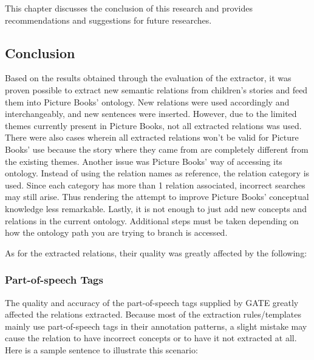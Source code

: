 %
%
%                 

\label{sec:conclusionandreco}

This chapter discusses the conclusion of this research and provides recommendations and suggestions for future researches.

\subsection{Conclusion}
\label{sec:conclusion}

Based on the results obtained through the evaluation of the extractor, it was proven possible to extract new semantic relations from children's stories and feed them into Picture Books' ontology. New relations were used accordingly and interchangeably, and new sentences were inserted. However, due to the limited themes currently present in Picture Books, not all extracted relations was used. There were also cases wherein all extracted relations won't be valid for Picture Books' use because the story where they came from are completely different from the existing themes. Another issue was Picture Books' way of accessing its ontology. Instead of using the relation names as reference, the relation category is used. Since each category has more than 1 relation associated, incorrect searches may still arise. Thus rendering the attempt to improve Picture Books' conceptual knowledge less remarkable. Lastly, it is not enough to just add new concepts and relations in the current ontology. Additional steps must be taken depending on how the ontology path you are trying to branch is accessed.

As for the extracted relations, their quality was greatly affected by the following:

\subsubsection{Part-of-speech Tags}
\label{sec:pos}

The quality and accuracy of the part-of-speech tags supplied by GATE greatly affected the relations extracted. Because most of the extraction rules/templates mainly use part-of-speech tags in their annotation patterns, a slight mistake may cause the relation to have incorrect concepts or to have it not extracted at all. Here is a sample sentence to illustrate this scenario:

